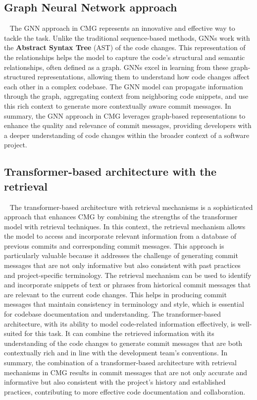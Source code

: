 \subsection{Graph Neural Network approach}~\label{sec:GNN_for_CMG}
The GNN approach in CMG represents an innovative and effective way to tackle the task. Unlike the traditional sequence-based methods, GNNs work with the \textbf{Abstract Syntax Tree} (AST) of the code changes. This representation of the relationships helps the model to capture the code's structural and semantic relationships, often defined as a graph.
GNNs excel in learning from these graph-structured representations, allowing them to understand how code changes affect each other in a complex codebase. The GNN model can propagate information through the graph, aggregating context from neighboring code snippets, and use this rich context to generate more contextually aware commit messages.
In summary, the GNN approach in CMG leverages graph-based representations to enhance the quality and relevance of commit messages, providing developers with a deeper understanding of code changes within the broader context of a software project.

\subsection{Transformer-based architecture with the retrieval}~\label{sec:retrieval_for_cmg}
The transformer-based architecture with retrieval mechanisms is a sophisticated approach that enhances CMG by combining the strengths of the transformer model with retrieval techniques. In this context, the retrieval mechanism allows the model to access and incorporate relevant information from a database of previous commits and corresponding commit messages.
This approach is particularly valuable because it addresses the challenge of generating commit messages that are not only informative but also consistent with past practices and project-specific terminology. The retrieval mechanism can be used to identify and incorporate snippets of text or phrases from historical commit messages that are relevant to the current code changes. This helps in producing commit messages that maintain consistency in terminology and style, which is essential for codebase documentation and understanding.
The transformer-based architecture, with its ability to model code-related information effectively, is well-suited for this task. It can combine the retrieved information with its understanding of the code changes to generate commit messages that are both contextually rich and in line with the development team's conventions.
In summary, the combination of a transformer-based architecture with retrieval mechanisms in CMG results in commit messages that are not only accurate and informative but also consistent with the project's history and established practices, contributing to more effective code documentation and collaboration.

